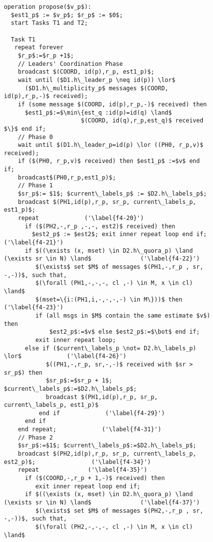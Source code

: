 \documentclass[10pt, conference, compsocconf]{IEEEtran}
\begin{document}
\begin{figure}
\begin{lstlisting}
operation propose($v_p$):
  $est1_p$ := $v_p$; $r_p$ := $0$;
  start Tasks T1 and T2;
  
  Task T1
   repeat forever
    $r_p$:=$r_p +1$; 
    // Leaders' Coordination Phase
    broadcast $(COORD, id(p),r_p, est1_p)$;
    wait until ($D1.h\_leader_p \neq id(p)) \lor$ 
      ($D1.h\_multiplicity_p$ messages $(COORD, id(p),r_p,-)$ received);
    if (some message $(COORD, id(p),r_p,-)$ received) then 
      $est1_p$:=$\min\{est_q :id(p)=id(q) \land$ 
                      $(COORD, id(q),r_p,est_q)$ received $\}$ end if;
    // Phase 0
    wait until $(D1.h\_leader_p=id(p) \lor ((PH0, r_p,v)$ received);
    if ($(PH0, r_p,v)$ received) then $est1_p$ :=$v$ end if; 
    broadcast$(PH0,r_p,est1_p)$;
    // Phase 1
    $sr_p$:= $1$; $current\_labels_p$ := $D2.h\_labels_p$; 
    broadcast $(PH1,id(p),r_p, sr_p, current\_labels_p, est1_p)$;
    repeat             ('\label{f4-20}')
      if ($(PH2,-,r_p ,-,-, est2)$ received) then 
        $est2_p$ := $est2$; exit inner repeat loop end if;              ('\label{f4-21}')
      if $((\exists (x, mset) \in D2.h\_quora_p) \land (\exists sr \in N) \land$              ('\label{f4-22}')
         $(\exists$ set $M$ of messages $(PH1,-,r_p , sr, -,-))$, such that, 
         $(\forall (PH1,-,-,-, cl ,-) \in M, x \in cl) \land$
         $(mset=\{i:(PH1,i,-,-,-,-) \in M\}))$ then             ('\label{f4-23}')
         if (all msgs in $M$ contain the same estimate $v$) then 
             $est2_p$:=$v$ else $est2_p$:=$\bot$ end if;
         exit inner repeat loop;
      else if ($current\_labels_p \not= D2.h\_labels_p) \lor$             ('\label{f4-26}')
            $((PH1,-,r_p, sr,-,-)$ received with $sr > sr_p$) then
            $sr_p$:=$sr_p + 1$; $current\_labels_p$:=$D2.h\_labels_p$; 
            broadcast $(PH1,id(p),r_p, sr_p, current\_labels_p, est1_p)$
          end if             ('\label{f4-29}')
      end if
    end repeat;             ('\label{f4-31}')
    // Phase 2 
    $sr_p$:=$1$; $current\_labels_p$:=$D2.h\_labels_p$;  
    broadcast $(PH2,id(p),r_p, sr_p, current\_labels_p, est2_p)$;                ('\label{f4-34}')
    repeat              ('\label{f4-35}')
      if ($(COORD,-,r_p + 1,-)$ received) then 
         exit inner repeat loop end if;
      if $((\exists (x, mset) \in D2.h\_quora_p) \land (\exists sr \in N) \land$              ('\label{f4-37}')
         $(\exists$ set $M$ of messages $(PH2,-,r_p , sr, -,-))$, such that, 
         $(\forall (PH2,-,-,-, cl ,-) \in M, x \in cl) \land$

\end{lstlisting}
\end{figure}
\end{document}
